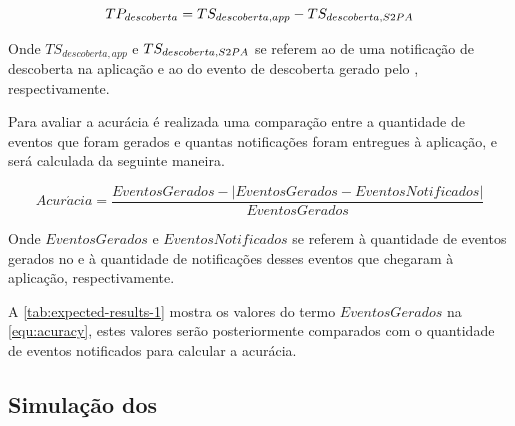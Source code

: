 \begin{equation}
	TP_{descoberta} = TS_{descoberta,app} - TS_{descoberta,S2PA{}}
\end{equation}

Onde $TS_{descoberta,app}$ e $TS_{descoberta,S2PA{}}$ se referem ao \timestamp{} de uma notificação de descoberta na aplicação e ao \timestamp{} do evento de descoberta gerado pelo \stwopa{}, respectivamente.

Para avaliar a acurácia é realizada uma comparação entre a quantidade de eventos que foram gerados e quantas notificações foram entregues à aplicação, e será calculada da seguinte maneira.

\begin{equation}
	\label{equ:acuracy}
	Acur\acute{a}cia = \frac{EventosGerados - |EventosGerados - EventosNotificados|}{EventosGerados}
\end{equation}

Onde $EventosGerados$ e $EventosNotificados$ se referem à quantidade de eventos gerados no \stwopa{} e à quantidade de notificações desses eventos que chegaram à aplicação, respectivamente.

A \autoref{tab:expected-results-1} mostra os valores do termo $EventosGerados$ na \autoref{equ:acuracy}, estes valores serão posteriormente comparados com o quantidade de eventos notificados para calcular a acurácia.

\begin{table}[htb]
	\begin{center}
	\end{center}
\end{table}

\subsection{Simulação dos \beacons{}}


